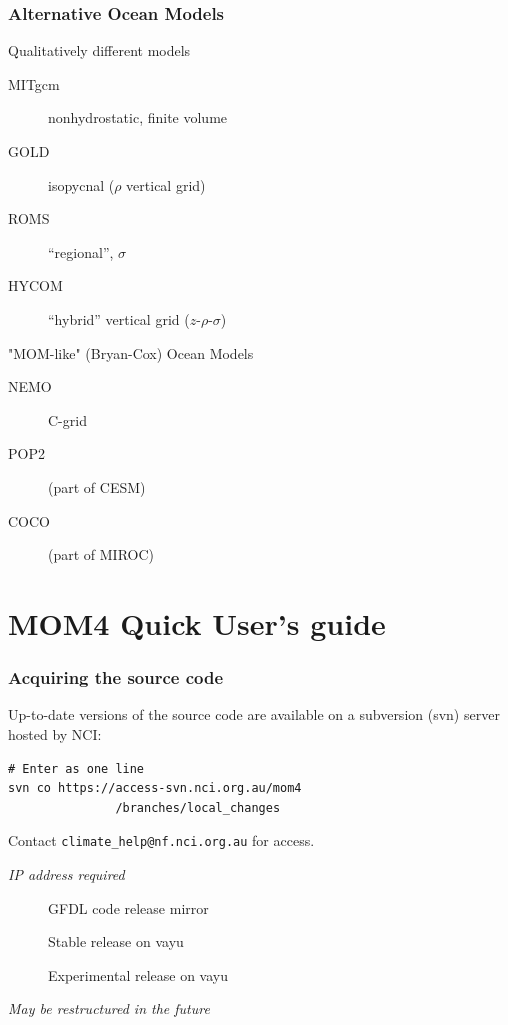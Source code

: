 \documentclass[red]{beamer}
\begin{document}
\begin{frame}
    \frametitle{Alternative Ocean Models}
    
    Qualitatively different models
    \begin{description}
        \item[MITgcm] nonhydrostatic, finite volume
        \item[GOLD] isopycnal ($\rho$ vertical grid)
        \item[ROMS] ``regional'', $\sigma$
        \item[HYCOM] ``hybrid'' vertical grid ($z$-$\rho$-$\sigma$)
    \end{description}
    
    "MOM-like" (Bryan-Cox) Ocean Models
    \begin{description}
        \item[NEMO] C-grid
        \item[POP2] (part of CESM)
        \item[COCO] (part of MIROC)
    \end{description}
\end{frame}

\section{MOM4 Quick User's guide}
\begin{frame}[fragile]
    \frametitle{Acquiring the source code}
    
    Up-to-date versions of the source code are available on a subversion (svn)
    server hosted by NCI:
    
    \begin{lstlisting}
# Enter as one line
svn co https://access-svn.nci.org.au/mom4
               /branches/local_changes
    \end{lstlisting}
    Contact \lstinline|climate_help@nf.nci.org.au| for access.
    
    \textit{IP address required}
    
    \begin{description}
        \item[] GFDL code release mirror
        \item[] Stable release on vayu
        \item[] Experimental release on vayu
    \end{description}
    
    \textit{May be restructured in the future}
\end{frame}
\end{document}
